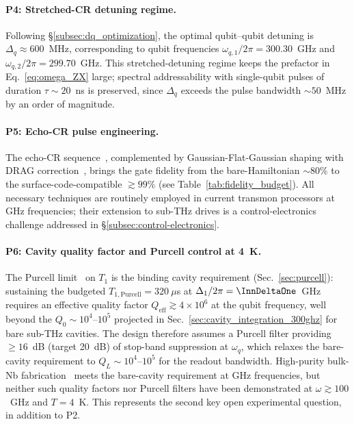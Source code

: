\paragraph{P4: Stretched-CR detuning regime.}
Following \S\ref{subsec:dq_optimization}, the optimal qubit--qubit detuning
is $\Delta_q \approx 600$~MHz, corresponding to qubit
frequencies $\omega_{q,1}/2\pi = 300.30$~GHz and
$\omega_{q,2}/2\pi = 299.70$~GHz. This stretched-detuning regime
keeps the prefactor in
Eq.~\eqref{eq:omega_ZX} large; spectral addressability with single-qubit
pulses of duration $\tau\!\sim\!20$~ns is preserved, since $\Delta_q$ exceeds
the pulse bandwidth $\sim 50$~MHz by an order of magnitude.

\paragraph{P5: Echo-CR pulse engineering.}
The echo-CR sequence~\cite{Sheldon2016}, complemented by Gaussian-Flat-Gaussian
shaping with DRAG correction~\cite{Motzoi2009, Gambetta2011},
brings the gate fidelity from the bare-Hamiltonian
$\sim 80\%$ to the surface-code-compatible $\gtrsim 99\%$ (see
Table~\ref{tab:fidelity_budget}). All necessary techniques are routinely
employed in current transmon processors at GHz frequencies; their
extension to sub-THz drives is a control-electronics challenge addressed in
\S\ref{subsec:control-electronics}.

\paragraph{P6: Cavity quality factor and Purcell control at 4~K.}
The Purcell limit~\cite{Schuster2005PRL} on $T_1$ is the binding cavity
requirement (Sec.~\ref{sec:purcell}): sustaining the budgeted
$T_{1,\text{Purcell}} = 320~\mu$s at $\Delta_1/2\pi = \InnDeltaOne$~GHz
requires an effective quality factor $Q_{\text{eff}} \gtrsim 4\times10^{6}$
at the qubit frequency, well beyond the $Q_0 \sim 10^4$--$10^5$ projected in
Sec.~\ref{sec:cavity_integration_300ghz} for bare sub-THz cavities. The
design therefore assumes a Purcell filter providing $\geq 16$~dB (target
20~dB) of stop-band suppression at $\omega_q$, which relaxes the bare-cavity
requirement to $Q_L \sim 10^4$--$10^5$ for the readout bandwidth. High-purity
bulk-Nb fabrication~\cite{Romanenko2020} meets the bare-cavity requirement at
GHz frequencies, but neither such quality factors nor Purcell filters have
been demonstrated at $\omega \gtrsim 100$~GHz and $T = 4$~K. This represents
the second key open experimental question, in addition to P2.

